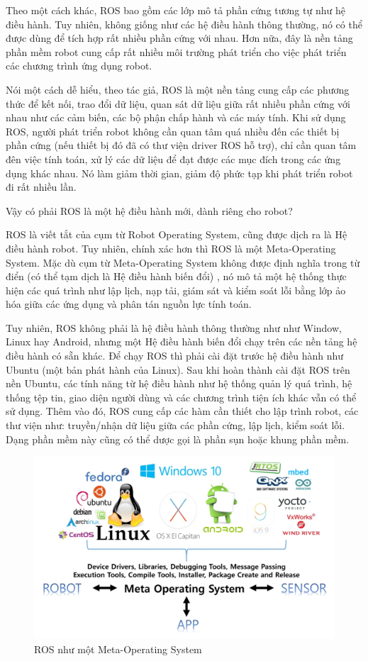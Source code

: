 Theo một cách khác, ROS bao gồm các lớp mô tả phần cứng tương tự như hệ điều hành. Tuy nhiên, không giống như các hệ điều hành thông thường, nó có thể được dùng để tích hợp rất nhiều phần cứng với nhau. Hơn nữa, đây là nền tảng phần mềm robot cung cấp rất nhiều môi trường phát triển cho việc phát triển các chương trình ứng dụng robot.

Nói một cách dễ hiểu, theo tác giả, ROS là một nền tảng cung cấp các phương thức để kết nối, trao đổi dữ liệu, quan sát dữ liệu giữa rất nhiều phần cứng với nhau như các cảm biến, các bộ phận chấp hành và các máy tính. Khi sử dụng ROS, người phát triển robot không cần quan tâm quá nhiều đến các thiết bị phần cứng (nếu thiết bị đó đã có thư viện driver ROS hỗ trợ), chỉ cần quan tâm đên việc tính toán, xử lý các dữ liệu để đạt được các mục đích trong các ứng dụng khác nhau. Nó làm giảm thời gian, giảm độ phức tạp khi phát triển robot đi rất nhiều lần. 

Vậy có phải ROS là một hệ điều hành mới, dành riêng cho robot?

ROS là viết tắt của cụm từ Robot Operating System, cũng được dịch ra là Hệ điều hành robot. Tuy nhiên, chính xác hơn thì ROS là một Meta-Operating System. Mặc dù cụm từ Meta-Operating System không được định nghĩa trong từ điển (có thể tạm dịch là Hệ điều hành biến đổi) , nó mô tả một hệ thống thực hiện các quá trình như lập lịch, nạp tải, giám sát và kiểm soát lỗi bằng lớp ảo hóa giữa các ứng dụng và phân tán nguồn lực tính toán.

Tuy nhiên, ROS không phải là hệ điều hành thông thường như như Window, Linux hay Android, nhưng một Hệ điều hành biến đổi chạy trên các nền tảng hệ điều hành có sẵn khác. Để chạy ROS thì phải cài đặt trước hệ điều hành như Ubuntu (một bản phát hành của Linux). Sau khi hoàn thành cài đặt ROS trên nền Ubuntu,  các tính năng từ hệ điều hành như hệ thống quản lý quá trình, hệ thống tệp tin, giao diện người dùng và các chương trình tiện ích khác vẫn có thể sử dụng. Thêm vào đó, ROS cung cấp các hàm cần thiết cho lập trình robot, các thư viện như: truyền/nhận dữ liệu giữa các phần cứng, lập lịch, kiểm soát lỗi. Dạng phần mềm này cũng có thể dược gọi là phần sụn hoặc khung phần mềm.

\begin{figure}[htp]
	\centering
	\includegraphics[width=1\linewidth]{chapter2/figs/meta_operatingSystem.pdf}
	\caption{ROS như một Meta-Operating System}
	\label{fig:ROSasMetaOS}
\end{figure}

